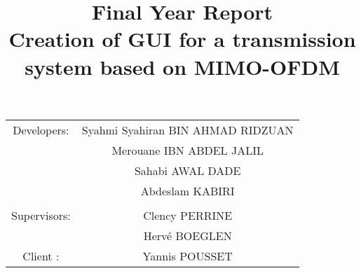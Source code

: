 \documentclass[12pt,a4paper]{article}
\begin{document}
\title{\textbf {\huge Final Year Report\\ Creation of GUI for a transmission system based on MIMO-OFDM}}
\maketitle

\begin{center}
\begin{tabular}{c c}
 
Developers: & Syahmi Syahiran BIN AHMAD RIDZUAN \\
& Merouane IBN ABDEL JALIL \\
& Sahabi AWAL DADE \\ 
& Abdeslam KABIRI\\ %
\\
Supervisors: &  Clency PERRINE \\ 
& Herv\'e BOEGLEN \\ %
Client : & Yannis POUSSET \\	
\end{tabular}
\end{center}

\clearpage

\tableofcontents


\begin{flushleft}



\clearpage




\clearpage



\clearpage



\clearpage



\clearpage



\clearpage



\clearpage



\newpage    
\nocite{*}
\printbibliography
\end{flushleft}
\end{document}
